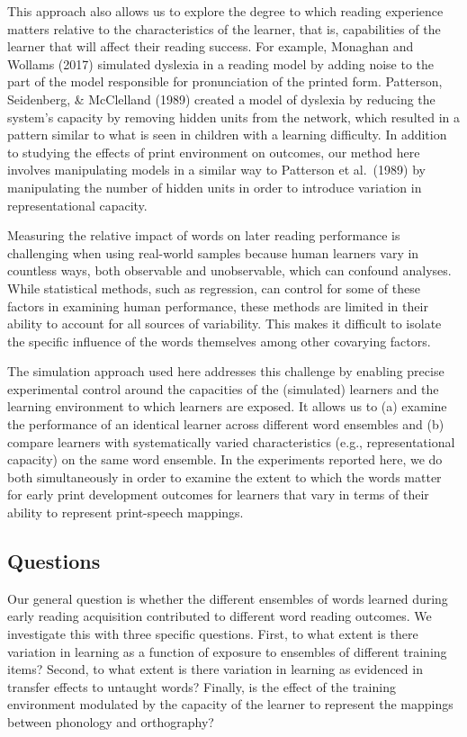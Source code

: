 \documentclass[
  ,man,floatsintext]{apa6}
\begin{document}
This approach also allows us to explore the degree to which reading experience matters relative to the characteristics of the learner, that is, capabilities of the learner that will affect their reading success. For example, Monaghan and Wollams (2017) simulated dyslexia in a reading model by adding noise to the part of the model responsible for pronunciation of the printed form. Patterson, Seidenberg, \& McClelland (1989) created a model of dyslexia by reducing the system's capacity by removing hidden units from the network, which resulted in a pattern similar to what is seen in children with a learning difficulty. In addition to studying the effects of print environment on outcomes, our method here involves manipulating models in a similar way to Patterson et al.~(1989) by manipulating the number of hidden units in order to introduce variation in representational capacity.

Measuring the relative impact of words on later reading performance is challenging when using real-world samples because human learners vary in countless ways, both observable and unobservable, which can confound analyses. While statistical methods, such as regression, can control for some of these factors in examining human performance, these methods are limited in their ability to account for all sources of variability. This makes it difficult to isolate the specific influence of the words themselves among other covarying factors.

The simulation approach used here addresses this challenge by enabling precise experimental control around the capacities of the (simulated) learners and the learning environment to which learners are exposed. It allows us to (a) examine the performance of an identical learner across different word ensembles and (b) compare learners with systematically varied characteristics (e.g., representational capacity) on the same word ensemble. In the experiments reported here, we do both simultaneously in order to examine the extent to which the words matter for early print development outcomes for learners that vary in terms of their ability to represent print-speech mappings.

\subsection{Questions}\label{questions}

Our general question is whether the different ensembles of words learned during early reading acquisition contributed to different word reading outcomes. We investigate this with three specific questions. First, to what extent is there variation in learning as a function of exposure to ensembles of different training items? Second, to what extent is there variation in learning as evidenced in transfer effects to untaught words? Finally, is the effect of the training environment modulated by the capacity of the learner to represent the mappings between phonology and orthography?
\end{document}
